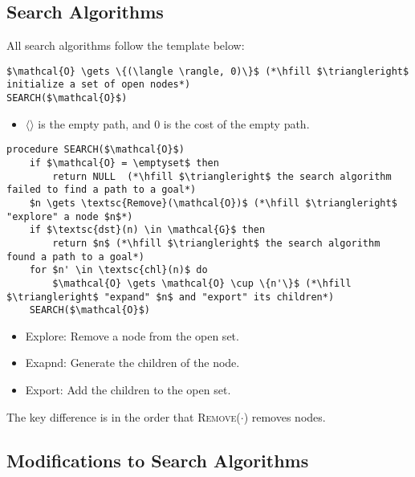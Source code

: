 \subsection{Search Algorithms}
\begin{definition}
    All search algorithms follow the template below:

\begin{lstlisting}
$\mathcal{O} \gets \{(\langle \rangle, 0)\}$ (*\hfill $\triangleright$ initialize a set of open nodes*) 
SEARCH($\mathcal{O}$)
\end{lstlisting}
\begin{itemize}
    \item $\langle \rangle$ is the empty path, and $0$ is the cost of the empty path.
\end{itemize}

\begin{lstlisting}
procedure SEARCH($\mathcal{O}$)
    if $\mathcal{O} = \emptyset$ then
        return NULL  (*\hfill $\triangleright$ the search algorithm failed to find a path to a goal*)
    $n \gets \textsc{Remove}(\mathcal{O})$ (*\hfill $\triangleright$ "explore" a node $n$*)
    if $\textsc{dst}(n) \in \mathcal{G}$ then
        return $n$ (*\hfill $\triangleright$ the search algorithm found a path to a goal*)
    for $n' \in \textsc{chl}(n)$ do
        $\mathcal{O} \gets \mathcal{O} \cup \{n'\}$ (*\hfill $\triangleright$ "expand" $n$ and "export" its children*)
    SEARCH($\mathcal{O}$)
\end{lstlisting}
\begin{itemize}
    \item Explore: Remove a node from the open set.
    \item Exapnd: Generate the children of the node.
    \item Export: Add the children to the open set.
\end{itemize}

\end{definition}

\begin{warning}
    The key difference is in the order that \textsc{Remove}($\cdot$) removes nodes.
\end{warning}

\subsection{Modifications to Search Algorithms}

